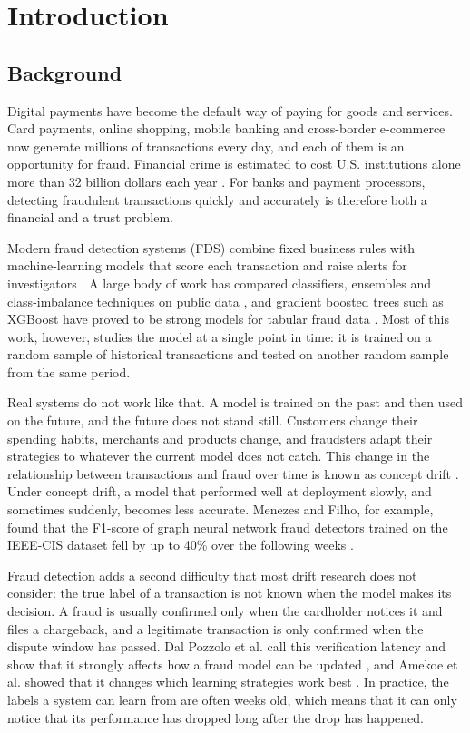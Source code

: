\chapter{Introduction}

\section{Background}

Digital payments have become the default way of paying for goods and services. Card payments, online shopping, mobile banking and cross-border e-commerce now generate millions of transactions every day, and each of them is an opportunity for fraud. Financial crime is estimated to cost U.S. institutions alone more than 32 billion dollars each year \cite{uddin2026}. For banks and payment processors, detecting fraudulent transactions quickly and accurately is therefore both a financial and a trust problem.

Modern fraud detection systems (FDS) combine fixed business rules with machine-learning models that score each transaction and raise alerts for investigators \cite{dalpozzolo2018,alessi2026}. A large body of work has compared classifiers, ensembles and class-imbalance techniques on public data \cite{dang2021,abdelnaby2023,sohony2018,mienye2023}, and gradient boosted trees such as XGBoost have proved to be strong models for tabular fraud data \cite{amekoe2024,uddin2026}. Most of this work, however, studies the model at a single point in time: it is trained on a random sample of historical transactions and tested on another random sample from the same period.

Real systems do not work like that. A model is trained on the past and then used on the future, and the future does not stand still. Customers change their spending habits, merchants and products change, and fraudsters adapt their strategies to whatever the current model does not catch. This change in the relationship between transactions and fraud over time is known as concept drift \cite{pulicharla2019,kodakandla2024}. Under concept drift, a model that performed well at deployment slowly, and sometimes suddenly, becomes less accurate. Menezes and Filho, for example, found that the F1-score of graph neural network fraud detectors trained on the IEEE-CIS dataset fell by up to 40\% over the following weeks \cite{menezes2025}.

Fraud detection adds a second difficulty that most drift research does not consider: the true label of a transaction is not known when the model makes its decision. A fraud is usually confirmed only when the cardholder notices it and files a chargeback, and a legitimate transaction is only confirmed when the dispute window has passed. Dal Pozzolo et al. call this verification latency and show that it strongly affects how a fraud model can be updated \cite{dalpozzolo2018}, and Amekoe et al. showed that it changes which learning strategies work best \cite{amekoe2024}. In practice, the labels a system can learn from are often weeks old, which means that it can only notice that its performance has dropped long after the drop has happened.

